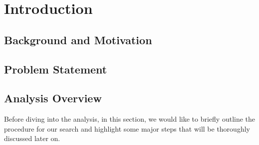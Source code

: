 \section{Introduction} \label{section:higgs_introduction}

\subsection{Background and Motivation}

\subsection{Problem Statement}

\subsection{Analysis Overview}
Before diving into the analysis, in this section, we would like to briefly outline the procedure for our search and highlight some major steps that will be thoroughly discussed later on.